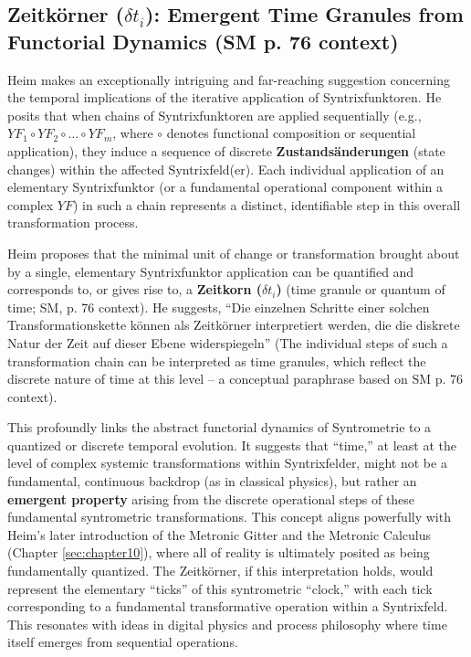 \documentclass[
    12pt,              %
    a4paper,           %
    headings=normal,   %
    twoside=true,      %
    BCOR=8mm,          %
]{scrbook}
\newcommand{\q}[1]{\enquote{#1}}
\newcommand{\syntrixfunktor}{YF}
\newcommand{\zeitkorn}{\delta t_i}
\begin{document}
\subsection{Zeitkörner (\(\zeitkorn\)): Emergent Time Granules from Functorial Dynamics (SM p. 76 context)}
\label{sec:ch4_sf_zeitkoerner_revised_2}

Heim makes an exceptionally intriguing and far-reaching suggestion concerning the temporal implications of the iterative application of Syntrixfunktoren. He posits that when chains of Syntrixfunktoren are applied sequentially (e.g., \(\syntrixfunktor_1 \circ \syntrixfunktor_2 \circ \ldots \circ \syntrixfunktor_m\), where \(\circ\) denotes functional composition or sequential application), they induce a sequence of discrete \textbf{Zustandsänderungen} (state changes) within the affected Syntrixfeld(er). Each individual application of an elementary Syntrixfunktor (or a fundamental operational component within a complex \(\syntrixfunktor\)) in such a chain represents a distinct, identifiable step in this overall transformation process.

Heim proposes that the minimal unit of change or transformation brought about by a single, elementary Syntrixfunktor application can be quantified and corresponds to, or gives rise to, a \textbf{Zeitkorn (\(\zeitkorn\))} (time granule or quantum of time; SM, p. 76 context). He suggests, \q{Die einzelnen Schritte einer solchen Transformationskette können als Zeitkörner interpretiert werden, die die diskrete Natur der Zeit auf dieser Ebene widerspiegeln} (The individual steps of such a transformation chain can be interpreted as time granules, which reflect the discrete nature of time at this level – a conceptual paraphrase based on SM p. 76 context).

This profoundly links the abstract functorial dynamics of Syntrometrie to a quantized or discrete temporal evolution. It suggests that \q{time,} at least at the level of complex systemic transformations within Syntrixfelder, might not be a fundamental, continuous backdrop (as in classical physics), but rather an \textbf{emergent property} arising from the discrete operational steps of these fundamental syntrometric transformations. This concept aligns powerfully with Heim's later introduction of the Metronic Gitter and the Metronic Calculus (Chapter \ref{sec:chapter10}), where all of reality is ultimately posited as being fundamentally quantized. The Zeitkörner, if this interpretation holds, would represent the elementary \q{ticks} of this syntrometric \q{clock,} with each tick corresponding to a fundamental transformative operation within a Syntrixfeld. This resonates with ideas in digital physics and process philosophy where time itself emerges from sequential operations.
\end{document}

